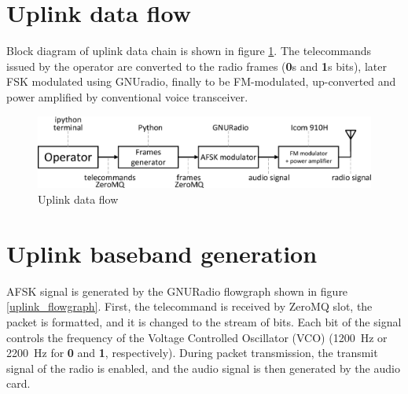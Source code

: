 
\newpage

\section{Uplink data flow}
Block diagram of uplink data chain is shown in figure \ref{uplink_data_flow}. The telecommands issued by the operator are converted to the radio frames (\textbf{0}s and \textbf{1}s bits), later FSK modulated using GNUradio, finally to be FM-modulated, up-converted and power amplified by conventional voice transceiver.

\begin{figure}[H]
    \centering
    \includegraphics[width=0.6\paperwidth]{img/7/uplink_data_flow.eps}
    \caption{Uplink data flow}
    \label{uplink_data_flow}
\end{figure}

\section{Uplink baseband generation}
AFSK signal is generated by the GNURadio flowgraph shown in figure \ref{uplink_flowgraph}. First, the telecommand is received by ZeroMQ slot, the packet is formatted, and it is changed to the stream of bits. Each bit of the signal controls the frequency of the Voltage Controlled Oscillator (VCO) (\SI{1200}{\hertz} or \SI{2200}{\hertz} for \textbf{0} and \textbf{1}, respectively). During packet transmission, the transmit signal of the radio is enabled, and the audio signal is then generated by the audio card.

